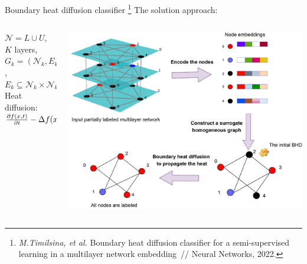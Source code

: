 \documentclass[12pt,pdf,hyperref={unicode}]{beamer}
\begin{document}
\begin{frame}{Boundary heat diffusion classifier%
\footnote{\textit{M.Timilsina, et al.}
Boundary heat diffusion classifier for a semi-supervised learning in a multilayer network embedding~// Neural Networks, 2022.}}
The solution approach:
\begin{columns}
\begin{column}{0.4\textwidth}
    $\mathcal{N} = L \cup U$, \\ 
    $K$ layers, $G_k = (\mathcal{N}_k, E_k)$, \\
    $E_k \subseteq \mathcal{N}_k \times \mathcal{N}_k, \mathcal{N}_k \subseteq \mathcal{N}$ \\
    \vspace{\baselineskip}
    Heat diffusion:
    $\pdv{f(x,t)}{t} - \Delta f(x,t) = 0$
\end{column}
\begin{column}{0.6\textwidth}
	\includegraphics[width=1\textwidth]{Holicheva-Step-3-fig}      
\end{column}
\end{columns}
\bigskip
\end{frame}
\end{document}
